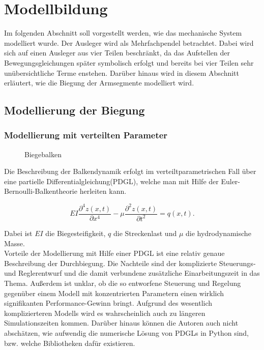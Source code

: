 \chapter{Modellbildung}
Im folgenden Abschnitt soll vorgestellt werden, wie das mechanische System modelliert wurde. 
Der Ausleger wird als Mehrfachpendel betrachtet. Dabei wird sich auf einen Ausleger aus vier Teilen beschränkt, da das Aufstellen der Bewegungsgleichungen später symbolisch erfolgt und bereits bei vier Teilen sehr unübersichtliche Terme enstehen. Darüber hinaus wird in diesem Abschnitt erläutert, wie die Biegung der Armsegmente modelliert wird.

\section{Modellierung der Biegung}
\subsection{Modellierung mit verteilten Parameter}

\begin{figure}[h!]
\centering
\def\svgscale{0.8}

\caption{Biegebalken}
\label{fig:VertPara}
\end{figure}

Die Beschreibung der Balkendynamik erfolgt im verteiltparametrischen Fall über eine partielle Differentialgleichung(PDGL), welche man mit Hilfe der Euler-Bernoulli-Balkentheorie herleiten kann. 

\begin{equation}
EI\dfrac{\partial^4 z(x,t)}{\partial x^4}-\mu \dfrac{\partial^2 z(x,t)}{\partial t^2} = q(x,t).
\end{equation}

Dabei ist $EI$ die Biegesteifigkeit, $q$ die Streckenlast und $\mu$ die hydrodynamische Masse.\\
Vorteile der Modellierung mit Hilfe einer PDGL ist eine relativ genaue Beschreibung der Durchbiegung. Die Nachteile sind der komplizierte Steuerungs- und Reglerentwurf und die damit verbundene zusätzliche Einarbeitungszeit in das Thema. Außerdem ist unklar, ob die so entworfene Steuerung und Regelung gegenüber einem Modell mit konzentrierten Parametern einen wirklich signifikanten Performance-Gewinn bringt. Aufgrund des wesentlich komplizierteren Modells wird es wahrscheinlich auch zu längeren Simulationszeiten kommen. Darüber hinaus können die Autoren auch nicht abschätzen, wie aufwendig die numerische Lösung von PDGLs in Python sind, bzw. welche Bibliotheken dafür existieren.


